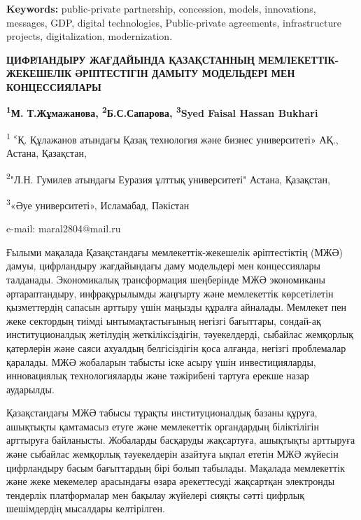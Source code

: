 {\bfseries Keywords:} public-private partnership, concession, models,
innovations, messages, GDP, digital technologies, Public-private
agreements, infrastructure projects, digitalization, modernization.

\begin{articleheader}
{\bfseries ЦИФРЛАНДЫРУ ЖАҒДАЙЫНДА ҚАЗАҚСТАННЫҢ МЕМЛЕКЕТТІК-ЖЕКЕШЕЛІК ӘРІПТЕСТІГІН ДАМЫТУ МОДЕЛЬДЕРІ МЕН КОНЦЕССИЯЛАРЫ}

{\bfseries
\textsuperscript{1}М. Т.Жұмажанова\textsuperscript{\envelope },
\textsuperscript{2}Б.С.Сапарова,
\textsuperscript{3}Syed Faisal Hassan Bukhari
}
\end{articleheader}

\begin{affiliation}
\textsuperscript{1 «}Қ. Құлажанов атындағы Қазақ технология және бизнес университеті» АҚ., Астана, Қазақстан,

\textsuperscript{2}"Л.Н. Гумилев атындағы Еуразия ұлттық университеті" Астана, Қазақстан,

\textsuperscript{3}«Әуе университеті», Исламабад, Пәкістан

e-mail: maral2804@mail.ru
\end{affiliation}

Ғылыми мақалада Қазақстандағы мемлекеттік-жекешелік әріптестіктің (МЖӘ)
дамуы, цифрландыру жағдайындағы даму модельдері мен концессиялары
талданады. Экономикалық трансформация шеңберінде МЖӘ экономиканы
әртараптандыру, инфрақұрылымды жаңғырту және мемлекеттік көрсетілетін
қызметтердің сапасын арттыру үшін маңызды құралға айналады. Мемлекет пен
жеке сектордың тиімді ынтымақтастығының негізгі бағыттары, сондай-ақ
институционалдық жетілудің жеткіліксіздігін, тәуекелдерді, сыбайлас
жемқорлық қатерлерін және саяси ахуалдың белгісіздігін қоса алғанда,
негізгі проблемалар қаралады. МЖӘ жобаларын табысты іске асыру үшін
инвестицияларды, инновациялық технологияларды және тәжірибені тартуға
ерекше назар аударылды.

Қазақстандағы МЖӘ табысы тұрақты институционалдық базаны құруға,
ашықтықты қамтамасыз етуге және мемлекеттік органдардың біліктілігін
арттыруға байланысты. Жобаларды басқаруды жақсартуға, ашықтықты
арттыруға және сыбайлас жемқорлық тәуекелдерін азайтуға ықпал ететін МЖӘ
жүйесін цифрландыру басым бағыттардың бірі болып табылады. Мақалада
мемлекеттік және жеке мекемелер арасындағы өзара әрекеттесуді жақсартқан
электронды тендерлік платформалар мен бақылау жүйелері сияқты сәтті
цифрлық шешімдердің мысалдары келтірілген.

